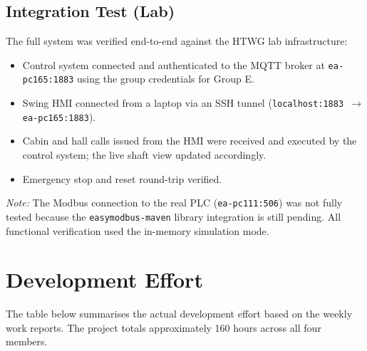 \documentclass[12pt,a4paper]{article}
\begin{document}
\subsection{Integration Test (Lab)}

The full system was verified end-to-end against the HTWG lab infrastructure:

\begin{itemize}
    \item Control system connected and authenticated to the MQTT broker at
          \texttt{ea-pc165:1883} using the group credentials for Group E.
    \item Swing HMI connected from a laptop via an SSH tunnel
          (\texttt{localhost:1883 $\to$ ea-pc165:1883}).
    \item Cabin and hall calls issued from the HMI were received and executed
          by the control system; the live shaft view updated accordingly.
    \item Emergency stop and reset round-trip verified.
\end{itemize}

\textit{Note:} The Modbus connection to the real PLC (\texttt{ea-pc111:506})
was not fully tested because the \texttt{easymodbus-maven} library integration
is still pending. All functional verification used the in-memory simulation mode.

\section{Development Effort}

The table below summarises the actual development effort based on the weekly
work reports. The project totals approximately 160 hours across all four members.
\end{document}
